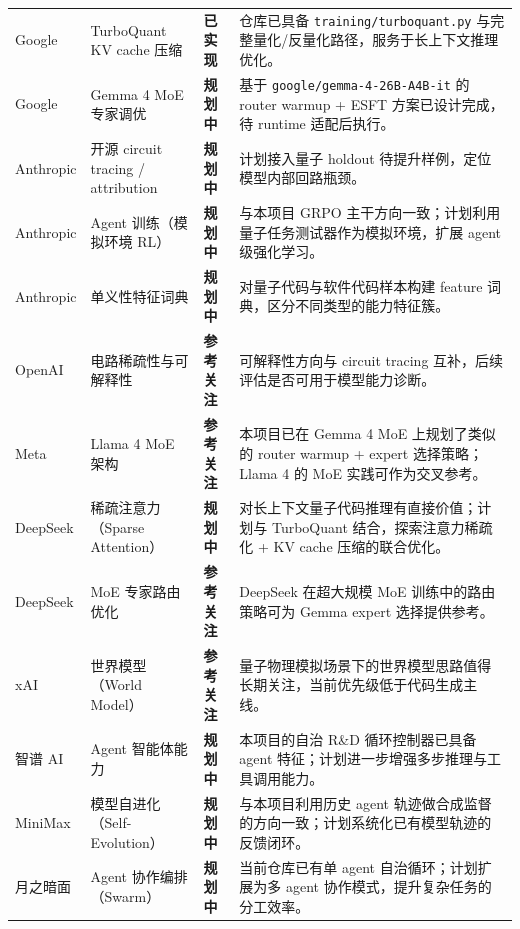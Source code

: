 \documentclass[11pt,a4paper]{article}
\newcommand{\code}[1]{\begingroup\ttfamily\footnotesize\nolinkurl{#1}\endgroup}
\begin{document}
\begin{longtable}{p{1.8cm} p{3.0cm} p{1.5cm} p{6.8cm}}
Google & TurboQuant KV cache 压缩 & \textcolor{green!50!black}{\textbf{已实现}} & 仓库已具备 \code{training/turboquant.py} 与完整量化/反量化路径，服务于长上下文推理优化。 \\
Google & Gemma 4 MoE 专家调优 & \textcolor{orange!80!black}{\textbf{规划中}} & 基于 \code{google/gemma-4-26B-A4B-it} 的 router warmup + ESFT 方案已设计完成，待 runtime 适配后执行。 \\
\midrule
Anthropic & 开源 circuit tracing / attribution & \textcolor{orange!80!black}{\textbf{规划中}} & 计划接入量子 holdout 待提升样例，定位模型内部回路瓶颈。 \\
Anthropic & Agent 训练（模拟环境 RL） & \textcolor{orange!80!black}{\textbf{规划中}} & 与本项目 GRPO 主干方向一致；计划利用量子任务测试器作为模拟环境，扩展 agent 级强化学习。 \\
Anthropic & 单义性特征词典 & \textcolor{orange!80!black}{\textbf{规划中}} & 对量子代码与软件代码样本构建 feature 词典，区分不同类型的能力特征簇。 \\
\midrule
OpenAI & 电路稀疏性与可解释性 & \textcolor{blue!60!black}{\textbf{参考关注}} & 可解释性方向与 circuit tracing 互补，后续评估是否可用于模型能力诊断。 \\
\midrule
Meta & Llama 4 MoE 架构 & \textcolor{blue!60!black}{\textbf{参考关注}} & 本项目已在 Gemma 4 MoE 上规划了类似的 router warmup + expert 选择策略；Llama 4 的 MoE 实践可作为交叉参考。 \\
\midrule
DeepSeek & 稀疏注意力（Sparse Attention） & \textcolor{orange!80!black}{\textbf{规划中}} & 对长上下文量子代码推理有直接价值；计划与 TurboQuant 结合，探索注意力稀疏化 + KV cache 压缩的联合优化。 \\
DeepSeek & MoE 专家路由优化 & \textcolor{blue!60!black}{\textbf{参考关注}} & DeepSeek 在超大规模 MoE 训练中的路由策略可为 Gemma expert 选择提供参考。 \\
\midrule
xAI & 世界模型（World Model） & \textcolor{blue!60!black}{\textbf{参考关注}} & 量子物理模拟场景下的世界模型思路值得长期关注，当前优先级低于代码生成主线。 \\
\midrule
智谱 AI & Agent 智能体能力 & \textcolor{orange!80!black}{\textbf{规划中}} & 本项目的自治 R\&D 循环控制器已具备 agent 特征；计划进一步增强多步推理与工具调用能力。 \\
\midrule
MiniMax & 模型自进化（Self-Evolution） & \textcolor{orange!80!black}{\textbf{规划中}} & 与本项目利用历史 agent 轨迹做合成监督的方向一致；计划系统化已有模型轨迹的反馈闭环。 \\
\midrule
月之暗面 & Agent 协作编排（Swarm） & \textcolor{orange!80!black}{\textbf{规划中}} & 当前仓库已有单 agent 自治循环；计划扩展为多 agent 协作模式，提升复杂任务的分工效率。 \\

\end{longtable}
\end{document}
